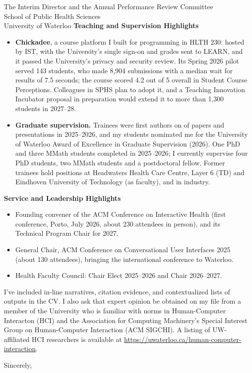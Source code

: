 \documentclass[12pt]{letter}
\begin{document}
\begin{letter}{%
The Interim Director and the Annual Performance Review Committee\\
School of Public Health Sciences\\
University of Waterloo}
\textbf{Teaching and Supervision Highlights}
\begin{itemize}
    \item \textbf{Chickadee}, a course platform I built for programming in HLTH 230: hosted by IST, with the University's single sign-on and grades sent to LEARN, and it passed the University's privacy and security review. Its Spring 2026 pilot served 143 students, who made 8,904 submissions with a median wait for results of 7.5 seconds; the course scored 4.2 out of 5 overall in Student Course Perceptions. Colleagues in SPHS plan to adopt it, and a Teaching Innovation Incubator proposal in preparation would extend it to more than 1,300 students in 2027--28.
    \item \textbf{Graduate supervision.} Trainees were first authors on  of  papers and presentations in 2025--2026, and my students nominated me for the University of Waterloo Award of Excellence in Graduate Supervision (2026). One PhD and three MMath students completed in 2025--2026; I currently supervise four PhD students, two MMath students and a postdoctoral fellow. Former trainees hold positions at Headwaters Health Care Centre, Layer 6 (TD) and Eindhoven University of Technology (as faculty), and in industry.
\end{itemize}

\textbf{Service and Leadership Highlights}
\begin{itemize}
    \item Founding convener of the ACM Conference on Interactive Health (first conference, Porto, July 2026, about 230 attendees in person), and its Technical Program Chair for 2027.
    \item General Chair, ACM Conference on Conversational User Interfaces 2025 (about 130 attendees), bringing the international conference to Waterloo.
    \item Health Faculty Council: Chair Elect 2025--2026 and Chair 2026--2027.
\end{itemize}

I've included in-line narratives, citation evidence, and contextualized lists of outputs in the CV. I also ask that expert opinion be obtained on my file from a member of the University who is familiar with norms in Human-Computer Interacton (HCI) and the Association for Computing Machinery's Special Interest Group on Human-Computer Interaction (ACM SIGCHI). A listing of UW-affiliated HCI researchers is available at \href{https://uwaterloo.ca/human-computer-interaction}{https://uwaterloo.ca/human-computer-interaction}. 

\closing{Sincerely,}
\end{letter}
\end{document}
